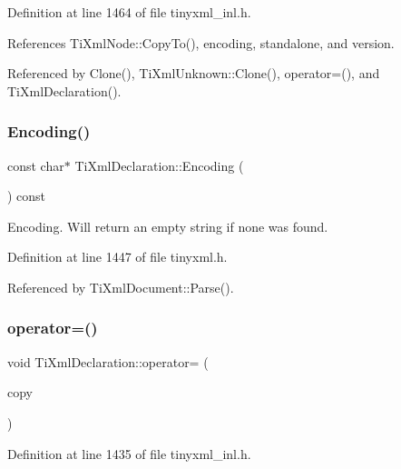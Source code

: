 Definition at line 1464 of file tinyxml\+\_\+inl.\+h.



References Ti\+Xml\+Node\+::\+Copy\+To(), encoding, standalone, and version.



Referenced by Clone(), Ti\+Xml\+Unknown\+::\+Clone(), operator=(), and Ti\+Xml\+Declaration().

\hypertarget{class_ti_xml_declaration_a8d3d1b5b226daa8353276d719497be80}{}\label{class_ti_xml_declaration_a8d3d1b5b226daa8353276d719497be80} 
\subsubsection{\texorpdfstring{Encoding()}{Encoding()}}
{\footnotesize\ttfamily const char$\ast$ Ti\+Xml\+Declaration\+::\+Encoding (\begin{DoxyParamCaption}{ }\end{DoxyParamCaption}) const\hspace{0.3cm}{\ttfamily [inline]}}



Encoding. Will return an empty string if none was found. 



Definition at line 1447 of file tinyxml.\+h.



Referenced by Ti\+Xml\+Document\+::\+Parse().

\hypertarget{class_ti_xml_declaration_a0fedc57539af9049be8db2d7d9d9ba33}{}\label{class_ti_xml_declaration_a0fedc57539af9049be8db2d7d9d9ba33} 
\subsubsection{\texorpdfstring{operator=()}{operator=()}}
{\footnotesize\ttfamily void Ti\+Xml\+Declaration\+::operator= (\begin{DoxyParamCaption}\item[{const \hyperlink{class_ti_xml_declaration}{Ti\+Xml\+Declaration} \&}]{copy }\end{DoxyParamCaption})}



Definition at line 1435 of file tinyxml\+\_\+inl.\+h.



